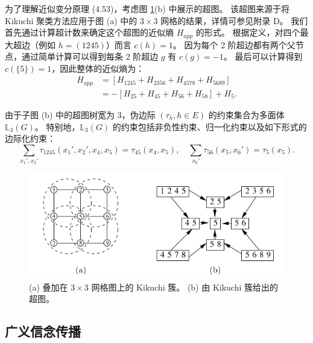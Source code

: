 \begin{tcolorbox}
\begin{exam}[Kikuchi 近似]

为了理解近似变分原理 (4.53)，考虑图 \ref{fig:4-5}(b) 中展示的超图。
该超图来源于将 Kikuchi 聚类方法应用于图 (a) 中的 $3 \times 3$ 网格的结果，详情可参见附录 D。
我们首先通过计算超计数来确定这个超图的近似熵 $H_{app}$ 的形式。
根据定义，对四个最大超边（例如 $h = (1245)$）而言 $c(h) = 1$。
因为每个 2 阶超边都有两个父节点，通过简单计算可以得到每条 2 阶超边 $g$ 有 $c(g) = -1$。
最后可以计算得到 $c(\{5\}) = 1$，因此整体的近似熵为：
\begin{align}
    H_{app} &= [H_{1245} + H_{2356} + H_{4578} + H_{5689}] \nonumber \\
    &= -[H_{25} + H_{45} + H_{56} + H_{58}] + H_5.
\end{align}

由于子图 (b) 中的超图树宽为 3，伪边际 $(\tau_h, h \in E)$ 的约束集合为多面体 $\mathbb{L}_3(G)$。
特别地，$\mathbb{L}_3(G)$ 的约束包括非负性约束、归一化约束以及如下形式的边际化约束：
\begin{equation*}
    \sum_{x_1', x_2'}\tau_{1245}(x_1', x_2', x_4, x_5) = \tau_{45}(x_4, x_5), \quad \sum_{x_6'}\tau_{56}(x_5, x_6') = \tau_5(x_5).
\end{equation*}

\end{exam}
\end{tcolorbox}

\begin{figure}[htbp]
    \centering
    \includegraphics[width=.9\linewidth]{figure/4-5.PNG}
    \caption{
        (a) 叠加在 $3 \times 3$ 网格图上的 Kikuchi 簇。
        (b) 由 Kikuchi 簇给出的超图。
    }\label{fig:4-5}
\end{figure}

\subsection{广义信念传播}

